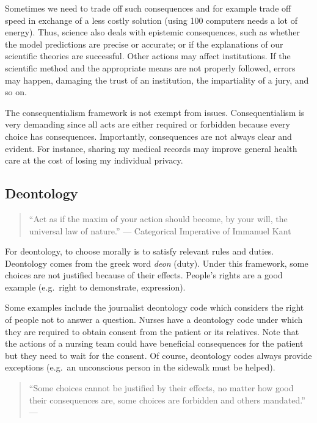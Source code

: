 \documentclass[
]{book}
\begin{document}
Sometimes we need to trade off such consequences and for example trade off speed in exchange of a less costly solution (using 100 computers needs a lot of energy). Thus, science also deals with epistemic consequences, such as whether the model predictions are precise or accurate; or if the explanations of our scientific theories are successful. Other actions may affect institutions. If the scientific method and the appropriate means are not properly followed, errors may happen, damaging the trust of an institution, the impartiality of a jury, and so on.

The consequentialism framework is not exempt from issues. Consequentialism is very demanding since all acts are either required or forbidden because every choice has consequences. Importantly, consequences are not always clear and evident. For instance, sharing my medical records may improve general health care at the cost of losing my individual privacy.

\hypertarget{deontology}{%
\subsection{Deontology}\label{deontology}}

\begin{quote}
``Act as if the maxim of your action should become, by your will, the universal law of nature.'' --- Categorical Imperative of Immanuel Kant
\end{quote}

For deontology, to choose morally is to satisfy relevant rules and duties. Deontology comes from the greek word \emph{deon} (duty). Under this framework, some choices are not justified because of their effects. People's rights are a good example (e.g.~right to demonstrate, expression).

Some examples include the journalist deontology code which considers the right of people not to answer a question. Nurses have a deontology code under which they are required to obtain consent from the patient or its relatives. Note that the actions of a nursing team could have beneficial consequences for the patient but they need to wait for the consent. Of course, deontology codes always provide exceptions (e.g.~an unconscious person in the sidewalk must be helped).

\begin{quote}
``Some choices cannot be justified by their effects, no matter how good their consequences are, some choices are forbidden and others mandated.'' --- \citep{sep-ethics-deontological}
\end{quote}
\end{document}

